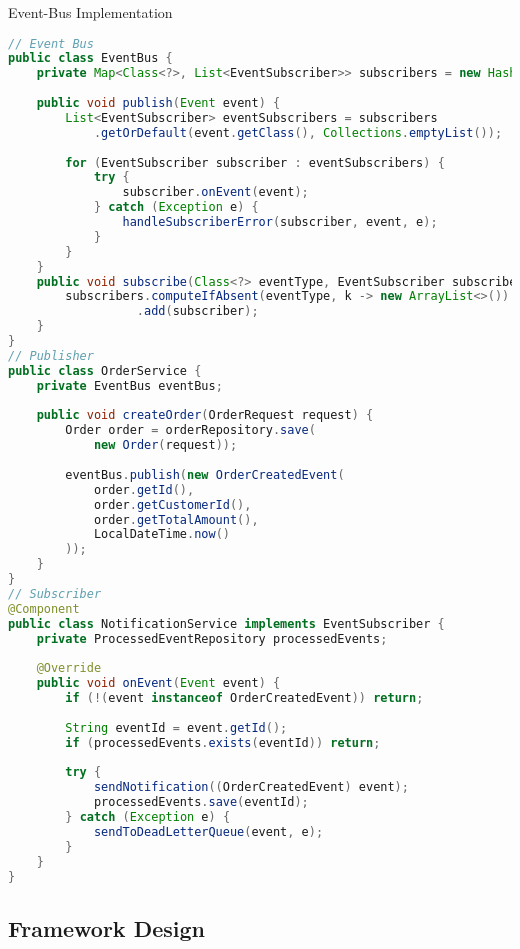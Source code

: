 \begin{example2}[breakable]{Event-Bus Implementation}
\begin{lstlisting}[language=Java, style=basesmol]
// Event Bus
public class EventBus {
    private Map<Class<?>, List<EventSubscriber>> subscribers = new HashMap<>();
    
    public void publish(Event event) {
        List<EventSubscriber> eventSubscribers = subscribers
            .getOrDefault(event.getClass(), Collections.emptyList());
            
        for (EventSubscriber subscriber : eventSubscribers) {
            try {
                subscriber.onEvent(event);
            } catch (Exception e) {
                handleSubscriberError(subscriber, event, e);
            }
        }
    }
    public void subscribe(Class<?> eventType, EventSubscriber subscriber) {
        subscribers.computeIfAbsent(eventType, k -> new ArrayList<>())
                  .add(subscriber);
    }
}
// Publisher
public class OrderService {
    private EventBus eventBus;
    
    public void createOrder(OrderRequest request) {
        Order order = orderRepository.save(
            new Order(request));
            
        eventBus.publish(new OrderCreatedEvent(
            order.getId(),
            order.getCustomerId(),
            order.getTotalAmount(),
            LocalDateTime.now()
        ));
    }
}
// Subscriber
@Component
public class NotificationService implements EventSubscriber {
    private ProcessedEventRepository processedEvents;
    
    @Override
    public void onEvent(Event event) {
        if (!(event instanceof OrderCreatedEvent)) return;
        
        String eventId = event.getId();
        if (processedEvents.exists(eventId)) return;
        
        try {
            sendNotification((OrderCreatedEvent) event);
            processedEvents.save(eventId);
        } catch (Exception e) {
            sendToDeadLetterQueue(event, e);
        }
    }
}
\end{lstlisting}
\end{example2}

\subsection{Framework Design}

